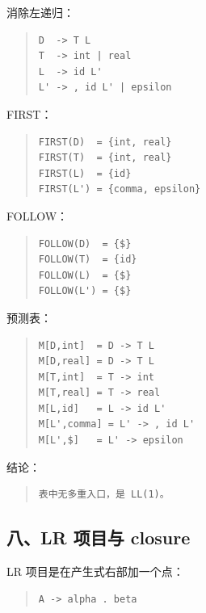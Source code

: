 \documentclass[UTF8,zihao=-4]{ctexart}
\begin{document}
消除左递归：


\begin{quote}
\footnotesize
\begin{verbatim}
D  -> T L
T  -> int | real
L  -> id L'
L' -> , id L' | epsilon
\end{verbatim}
\end{quote}


FIRST：


\begin{quote}
\footnotesize
\begin{verbatim}
FIRST(D)  = {int, real}
FIRST(T)  = {int, real}
FIRST(L)  = {id}
FIRST(L') = {comma, epsilon}
\end{verbatim}
\end{quote}


FOLLOW：


\begin{quote}
\footnotesize
\begin{verbatim}
FOLLOW(D)  = {$}
FOLLOW(T)  = {id}
FOLLOW(L)  = {$}
FOLLOW(L') = {$}
\end{verbatim}
\end{quote}


预测表：


\begin{quote}
\footnotesize
\begin{verbatim}
M[D,int]  = D -> T L
M[D,real] = D -> T L
M[T,int]  = T -> int
M[T,real] = T -> real
M[L,id]   = L -> id L'
M[L',comma] = L' -> , id L'
M[L',$]   = L' -> epsilon
\end{verbatim}
\end{quote}


结论：


\begin{quote}
\footnotesize
\begin{verbatim}
表中无多重入口，是 LL(1)。
\end{verbatim}
\end{quote}


\subsection{八、LR 项目与 closure}


LR 项目是在产生式右部加一个点：


\begin{quote}
\footnotesize
\begin{verbatim}
A -> alpha . beta
\end{verbatim}
\end{quote}
\end{document}
